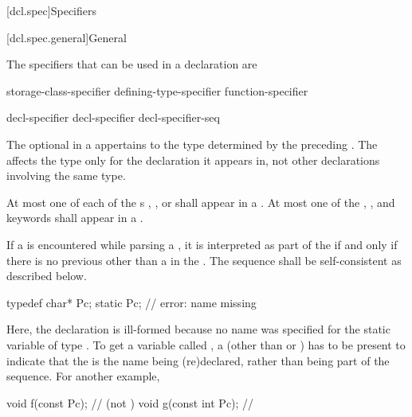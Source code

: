 [dcl.spec]{Specifiers}%

[dcl.spec.general]{General}%

\pnum
{}%
The specifiers that can be used in a declaration are
\begin{bnf}
\br
    storage-class-specifier\br
    defining-type-specifier\br
    function-specifier\br
    \br
    \br
    \br
    \br
    \br
\end{bnf}

\begin{bnf}
\br
    decl-specifier \br
    decl-specifier decl-specifier-seq
\end{bnf}

The optional  in a 
appertains to the type determined by the preceding
. The 
affects the type only for the declaration it appears in, not other declarations involving the
same type.

\pnum
At most one of each of the s
, , or 
shall appear in a .
At most one of
the , , and  keywords
shall appear in a .

\pnum
{}%
If a  is encountered while parsing a ,
it is interpreted as part of the  if and only if there is no
previous  other than a  in the
.
The sequence shall be self-consistent as
described below.
\begin{example}
\begin{codeblock}
typedef char* Pc;
static Pc;                      // error: name missing
\end{codeblock}
Here, the declaration   is ill-formed because no
name was specified for the static variable of type . To get a
variable called , a  (other than
 or ) has to be present to indicate that
the   is the name being (re)declared,
rather than being part of the  sequence. For
another example,
\begin{codeblock}
void f(const Pc);               //  (not )
void g(const int Pc);           // 
\end{codeblock}
\end{example}

